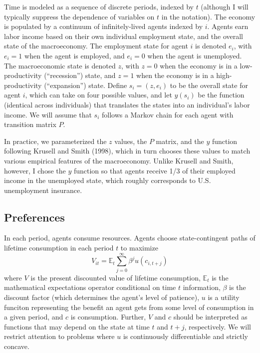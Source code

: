 \documentclass[a4paper,12pt]{article}
\newcommand{\E}{\mathbb{E}}
\numberwithin{equation}{section}
\theoremstyle{definition}
\begin{document}
Time is modeled as a sequence of discrete periods, indexed by $t$
(although I will typically suppress the dependence of variables on $t$
in the notation). The economy is populated by a continuum of
infinitely-lived agents indexed by $i$. Agents earn labor income based
on their own individual employment state, and the overall state of the
macroeconomy. The employment state for agent $i$ is denoted $e_i$,
with $e_i = 1$ when the agent is employed, and $e_i = 0$ when the
agent is unemployed. The macroeconomic state is denoted $z$, with $z =
0$ when the economy is in a low-productivity (``recession'') state,
and $z = 1$ when the economy is in a high-productivity (``expansion'')
state. Define $s_i = (z, e_i)$ to be the overall state for agent $i$,
which can take on four possible values, and let $y(s_i)$ be the
function (identical across individuals) that translates the states
into an individual's labor income. We will assume that $s_i$ follows a
Markov chain for each agent with transition matrix $P$. 

In practice, we parameterized the $z$ values, the $P$ matrix, and the $y$ function following Krusell and Smith (1998), which in turn chooses these values to match various empirical features of the macroeconomy. Unlike Krusell and Smith, however, I chose the $y$ function so that agents receive 1/3 of their employed income in the unemployed state, which roughly corresponds to U.S. unemployment insurance. 

\subsection{Preferences}

In each period, agents consume resources. Agents choose
state-contingent paths of lifetime consumption in each period $t$ to
maximize
\begin{equation*} 
  V_{it} = \E_t \sum_{j=0}^\infty \beta^j u(c_{i,t+j}) 
\end{equation*} 
where $V$ is the present discounted value of lifetime consumption, $\E_t$ is the mathematical expectations operator conditional on time $t$ information, $\beta$ is the discount factor (which determines the agent's level of patience), $u$ is a utility funciton representing the benefit an agent gets from some level of consumption in a given period, and $c$ is consumption. Further, $V$ and $c$ should be interpreted as functions that may depend on the state at time $t$ and $t+j$, respectively. We will restrict attention to problems where $u$ is continuously differentiable and strictly concave.
\end{document}
